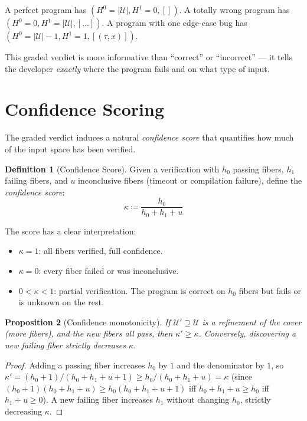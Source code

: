 \documentclass[11pt,a4paper]{report}
\theoremstyle{definition}
\newtheorem{definition}{Definition}[chapter]
\theoremstyle{plain}
\newtheorem{proposition}[definition]{Proposition}
\newcommand{\covers}{\mathcal{U}}
\newcommand{\Hzero}{H^0}
\newcommand{\Hone}{H^1}
\begin{document}
A perfect program has $(\Hzero = |\covers|, \Hone = 0, [])$.
A totally wrong program has $(\Hzero = 0, \Hone = |\covers|,
[\ldots])$.
A program with one edge-case bug has
$(\Hzero = |\covers| - 1, \Hone = 1, [(\tau, x)])$.

This graded verdict is more informative than ``correct'' or
``incorrect'' --- it tells the developer \emph{exactly} where the
program fails and on what type of input.

\section{Confidence Scoring}

The graded verdict induces a natural \emph{confidence score} that
quantifies how much of the input space has been verified.

\begin{definition}[Confidence Score]
\label{def:confidence}
Given a verification with $h_0$ passing fibers, $h_1$ failing fibers,
and $u$ inconclusive fibers (timeout or compilation failure), define
the \emph{confidence score}:
\[
  \kappa \coloneqq \frac{h_0}{h_0 + h_1 + u}
\]
\end{definition}

The score has a clear interpretation:
\begin{itemize}
  \item $\kappa = 1$: all fibers verified, full confidence.
  \item $\kappa = 0$: every fiber failed or was inconclusive.
  \item $0 < \kappa < 1$: partial verification. The program is
    correct on $h_0$ fibers but fails or is unknown on the rest.
\end{itemize}

\begin{proposition}[Confidence monotonicity]
If $\covers' \supseteq \covers$ is a refinement of the cover (more
fibers), and the new fibers all pass, then $\kappa' \geq \kappa$.
Conversely, discovering a new failing fiber strictly decreases
$\kappa$.
\end{proposition}

\begin{proof}
Adding a passing fiber increases $h_0$ by $1$ and the denominator
by $1$, so $\kappa' = (h_0 + 1) / (h_0 + h_1 + u + 1) \geq
h_0 / (h_0 + h_1 + u) = \kappa$ (since $(h_0+1)(h_0+h_1+u) \geq
h_0(h_0+h_1+u+1)$ iff $h_0 + h_1 + u \geq h_0$ iff $h_1 + u \geq 0$).
A new failing fiber increases $h_1$ without changing $h_0$, strictly
decreasing $\kappa$.
\end{proof}
\end{document}
